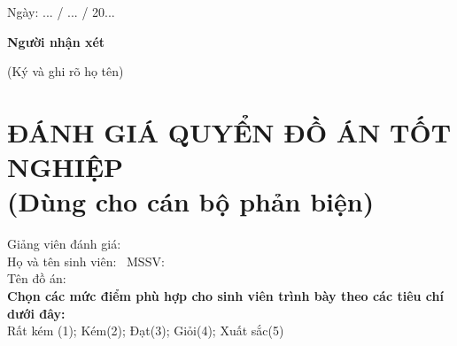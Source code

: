\hspace{9cm} Ngày: ... / ... / 20...

\hspace{9.3cm}\textbf{Người nhận xét}

\vspace{-6pt}
\hspace{9cm}(Ký và ghi rõ họ tên)
\cleardoublepage

\section*{ĐÁNH GIÁ QUYỂN ĐỒ ÁN TỐT NGHIỆP\\\fontsize{14pt}{0pt}\selectfont \vspace{4pt}\textnormal{(Dùng cho cán bộ phản biện)}}
\thispagestyle{empty}
\vspace{-16pt}
\hspace{-1cm}Giảng viên đánh giá:\dotfill\\
Họ và tên sinh viên:\,\,\,\dotfill \hspace{15pt} MSSV:\,\,\,\dotfill\\
Tên đồ án: \dotfill\\
\textbf{Chọn các mức điểm phù hợp cho sinh viên trình bày theo các tiêu chí dưới đây:}\\
Rất kém (1); Kém(2); Đạt(3); Giỏi(4); Xuất sắc(5)
